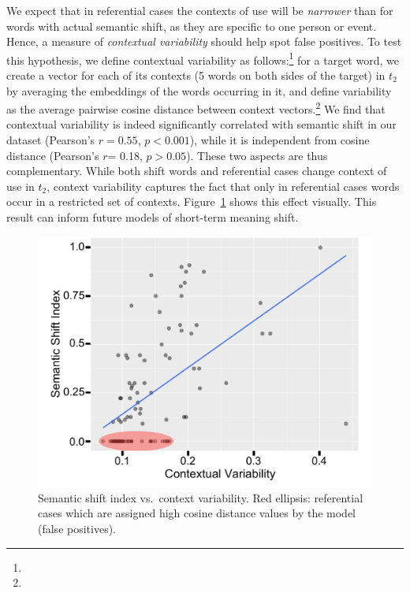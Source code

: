 We expect that in referential cases the contexts of use will 
be \textit{narrower} than for words with actual
semantic shift, as they are specific to one person or
event. Hence, a measure of \textit{contextual variability}
should help spot false positives.  To test this hypothesis, we define
contextual variability as follows:\footnote{} for a target word, we create a
vector for each of its contexts (5 words on both sides of the target) in $t_2$ by averaging the embeddings of
the words occurring in it, and define variability as the average
pairwise cosine distance between context vectors.\footnote{} 
We find that
contextual variability is indeed significantly correlated with
semantic shift in our dataset (Pearson's $r\!=\!0.55$, $p\!<\!0.001$),
while it is independent from cosine distance (Pearson's $r$= 0.18,
$p> 0.05$). These two aspects are thus complementary. While both shift
words and referential cases change context of use in $t_2$, context
variability captures the fact that only in referential cases words
occur in a restricted set of contexts. 
Figure~\ref{fig:shift-variability} shows this effect visually.  This
result can inform future 
models of short-term meaning
shift.

\begin{figure}[h!]\centering
\includegraphics[width=\columnwidth]{images/contextual_variability_shift_index_annotated_3.pdf}
\vspace*{-2pt}
\caption{Semantic shift index vs.~context variability. Red ellipsis: referential cases which are assigned high cosine distance values by the model (false positives).\label{fig:shift-variability}}
\vspace*{-5pt}
\end{figure}


